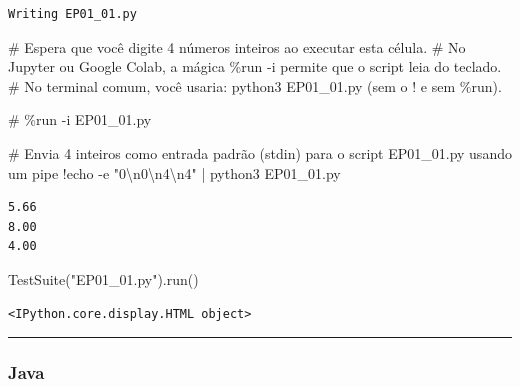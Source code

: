 \documentclass[
  portuguese,
  letterpaper,
  openany,
  oneside,
  12pt,
  a4paper]{book}
\newenvironment{Shaded}{\begin{snugshade}}{\end{snugshade}}
\newcommand{\CharTok}[1]{\textcolor[rgb]{0.13,0.47,0.30}{#1}}
\newcommand{\CommentTok}[1]{\textcolor[rgb]{0.37,0.37,0.37}{#1}}
\newcommand{\NormalTok}[1]{\textcolor[rgb]{0.00,0.23,0.31}{#1}}
\newcommand{\OperatorTok}[1]{\textcolor[rgb]{0.37,0.37,0.37}{#1}}
\newcommand{\StringTok}[1]{\textcolor[rgb]{0.13,0.47,0.30}{#1}}
\begin{document}
\begin{verbatim}
Writing EP01_01.py
\end{verbatim}

\begin{Shaded}
\begin{Highlighting}[]
\CommentTok{\# Espera que você digite 4 números inteiros ao executar esta célula.}
\CommentTok{\# No Jupyter ou Google Colab, a mágica \%run {-}i permite que o script leia do teclado.}
\CommentTok{\# No terminal comum, você usaria: python3 EP01\_01.py (sem o \textquotesingle{}!\textquotesingle{} e sem \textquotesingle{}\%run\textquotesingle{}).}

\CommentTok{\# \%run {-}i EP01\_01.py}
\end{Highlighting}
\end{Shaded}

\begin{Shaded}
\begin{Highlighting}[]
\CommentTok{\# Envia 4 inteiros como entrada padrão (stdin) para o script EP01\_01.py usando um pipe}
\OperatorTok{!}\NormalTok{echo }\OperatorTok{{-}}\NormalTok{e }\StringTok{"0}\CharTok{\textbackslash{}n}\StringTok{0}\CharTok{\textbackslash{}n}\StringTok{4}\CharTok{\textbackslash{}n}\StringTok{4"} \OperatorTok{|}\NormalTok{ python3 EP01\_01.py}
\end{Highlighting}
\end{Shaded}

\begin{verbatim}
5.66
8.00
4.00
\end{verbatim}

\begin{Shaded}
\begin{Highlighting}[]
\NormalTok{TestSuite(}\StringTok{"EP01\_01.py"}\NormalTok{).run()}
\end{Highlighting}
\end{Shaded}

\begin{verbatim}
<IPython.core.display.HTML object>
\end{verbatim}

\begin{center}\rule{0.5\linewidth}{0.5pt}\end{center}

\subsubsection{\texorpdfstring{
Java}{ Java}}\label{java}
\end{document}
